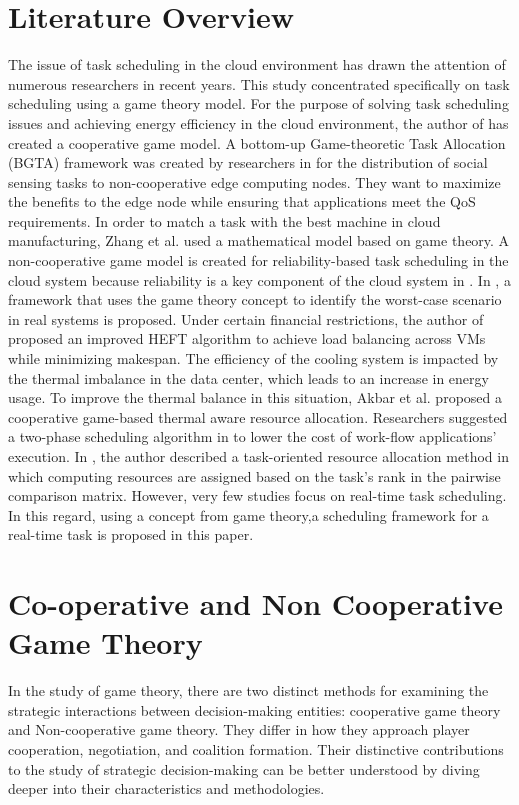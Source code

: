 \documentclass[conference]{IEEEtran}
\begin{document}
\bigskip
\section{Literature Overview}
The issue of task scheduling in the cloud environment has drawn the attention of numerous researchers in recent years. This study concentrated specifically on task scheduling using a game theory model. For the purpose of solving task scheduling issues and achieving energy efficiency in the cloud environment, the author of \cite{yang2020task} has created a cooperative game model. A bottom-up Game-theoretic Task Allocation (BGTA) framework was created by researchers in \cite{zhang2018real} for the distribution of social sensing tasks to non-cooperative edge computing nodes.
They want to maximize the benefits to the edge node while ensuring that applications meet the QoS requirements. In order to match a task with the best machine in cloud manufacturing, Zhang et al. \cite{zhang2017game} used a mathematical model based on game theory. A non-cooperative game model is created for reliability-based task scheduling in the cloud system because reliability is a key component of the cloud system in \cite{li2014non}. In \cite{roungas2019game}, a framework that uses the game theory concept to identify the worst-case scenario in real systems is proposed. Under certain financial restrictions, the author of \cite{samadi2018heft} proposed an improved HEFT algorithm to achieve load balancing across VMs while minimizing makespan. The efficiency of the cooling system is impacted by the thermal imbalance in the data center, which leads to an increase in energy usage. To improve the thermal balance in this situation, Akbar et al. \cite{akbar2019game} proposed a cooperative game-based thermal aware resource allocation. Researchers suggested a two-phase scheduling algorithm in \cite{abrishami2013deadline} to lower the cost of work-flow applications' execution. In \cite{ergu2013analytic}, the author described a task-oriented resource allocation method in which computing resources are assigned based on the task's rank in the pairwise comparison matrix.  However, very few studies focus on real-time task scheduling. In this regard, using a concept from game theory,a scheduling framework for a real-time task is proposed in this paper.

\bigskip
\section{\textbf{Co-operative and Non Cooperative Game Theory}}
In the study of game theory, there are two distinct methods for examining the strategic interactions between decision-making entities: cooperative game theory and Non-cooperative game theory. They differ in how they approach player cooperation, negotiation, and coalition formation. Their distinctive contributions to the study of strategic decision-making can be better understood by diving deeper into their characteristics and methodologies.
\end{document}
